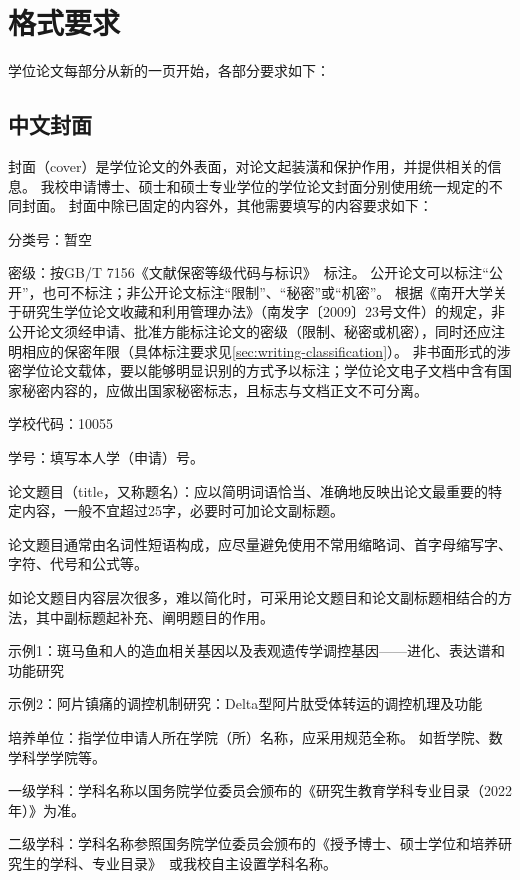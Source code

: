 \chapter{格式要求}
\label{chap:format-requirements}

学位论文每部分从新的一页开始，各部分要求如下：

\section{中文封面}
\label{sec:format-cover}

封面（cover）是学位论文的外表面，对论文起装潢和保护作用，并提供相关的信息。
我校申请博士、硕士和硕士专业学位的学位论文封面分别使用统一规定的不同封面。
封面中除已固定的内容外，其他需要填写的内容要求如下：

{\heiti 分类号：}暂空

{\heiti 密级：}按GB/T 7156《文献保密等级代码与标识》~\cite{SCSF00000734}标注。
公开论文可以标注“公开”，也可不标注；非公开论文标注“限制”、“秘密”或“机密”。
根据《南开大学关于研究生学位论文收藏和利用管理办法》（南发字〔2009〕23号文件）的规定，非公开论文须经申请、批准方能标注论文的密级（限制、秘密或机密），同时还应注明相应的保密年限（具体标注要求见\ref{sec:writing-classification}）。
非书面形式的涉密学位论文载体，要以能够明显识别的方式予以标注；学位论文电子文档中含有国家秘密内容的，应做出国家秘密标志，且标志与文档正文不可分离。

{\heiti 学校代码：}10055

{\heiti 学号：}填写本人学（申请）号。

{\heiti 论文题目（title，又称题名）：}应以简明词语恰当、准确地反映出论文最重要的特定内容，一般不宜超过25字，必要时可加论文副标题。

论文题目通常由名词性短语构成，应尽量避免使用不常用缩略词、首字母缩写字、字符、代号和公式等。

如论文题目内容层次很多，难以简化时，可采用论文题目和论文副标题相结合的方法，其中副标题起补充、阐明题目的作用。

示例1：斑马鱼和人的造血相关基因以及表观遗传学调控基因——进化、表达谱和功能研究

示例2：阿片镇痛的调控机制研究：Delta型阿片肽受体转运的调控机理及功能

{\heiti 培养单位：}指学位申请人所在学院（所）名称，应采用规范全称。
如哲学院、数学科学学院等。

{\heiti 一级学科：}学科名称以国务院学位委员会颁布的《研究生教育学科专业目录（2022年）》为准。

{\heiti 二级学科：}学科名称参照国务院学位委员会颁布的《授予博士、硕士学位和培养研究生的学科、专业目录》~\cite{REF00000002}或我校自主设置学科名称。

